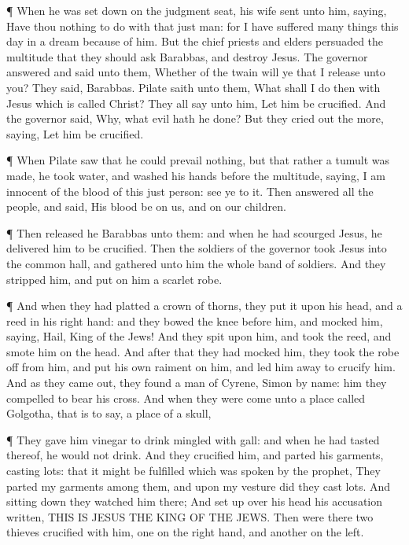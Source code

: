  ¶ When he was set down on the judgment seat, his wife sent
unto him, saying, Have thou nothing to do with that just man: for I have
suffered many things this day in a dream because of him. 
But the chief priests and elders persuaded the multitude that they
should ask Barabbas, and destroy Jesus.  The governor
answered and said unto them, Whether of the twain will ye that I release
unto you? They said, Barabbas.  Pilate saith unto them,
What shall I do then with Jesus which is called Christ? They all say
unto him, Let him be crucified.  And the governor said,
Why, what evil hath he done? But they cried out the more, saying, Let
him be crucified.

 ¶ When Pilate saw that he could prevail nothing, but that
rather a tumult was made, he took water, and washed his hands before the
multitude, saying, I am innocent of the blood of this just person: see
ye to it.  Then answered all the people, and said, His
blood be on us, and on our children.

 ¶ Then released he Barabbas unto them: and when he had
scourged Jesus, he delivered him to be crucified.  Then the
soldiers of the governor took Jesus into the common hall, and gathered
unto him the whole band of soldiers.  And they stripped
him, and put on him a scarlet robe.

 ¶ And when they had platted a crown of thorns, they put it
upon his head, and a reed in his right hand: and they bowed the knee
before him, and mocked him, saying, Hail, King of the Jews!
 And they spit upon him, and took the reed, and smote him
on the head.  And after that they had mocked him, they took
the robe off from him, and put his own raiment on him, and led him away
to crucify him.  And as they came out, they found a man of
Cyrene, Simon by name: him they compelled to bear his cross.
 And when they were come unto a place called Golgotha, that
is to say, a place of a skull,

 ¶ They gave him vinegar to drink mingled with gall: and
when he had tasted thereof, he would not drink.  And they
crucified him, and parted his garments, casting lots: that it might be
fulfilled which was spoken by the prophet, They parted my garments among
them, and upon my vesture did they cast lots.  And sitting
down they watched him there;  And set up over his head his
accusation written, THIS IS JESUS THE KING OF THE JEWS. 
Then were there two thieves crucified with him, one on the right hand,
and another on the left.


